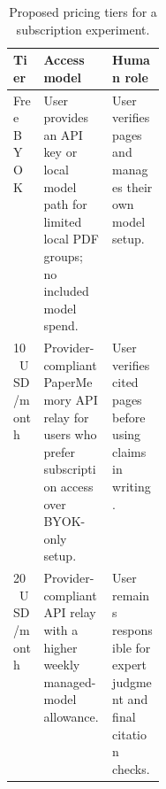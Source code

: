 \begin{table}[t]
  \caption{Proposed pricing tiers for a subscription experiment.}
  \label{tab:pricing-tiers}
  \centering
  \small
  \setlength{\tabcolsep}{4pt}
  \begin{tabularx}{\linewidth}{p{0.2\linewidth}YY}
    \toprule
    Tier & Access model & Human role \\
    \midrule
    Free BYOK & User provides an API key or local model path for limited local PDF groups; no included model spend. & User verifies pages and manages their own model setup. \\
    10~USD/month & Provider-compliant PaperMemory API relay for users who prefer subscription access over BYOK-only setup. & User verifies cited pages before using claims in writing. \\
    20~USD/month & Provider-compliant API relay with a higher weekly managed-model allowance. & User remains responsible for expert judgment and final citation checks. \\
    \bottomrule
  \end{tabularx}
\end{table}
